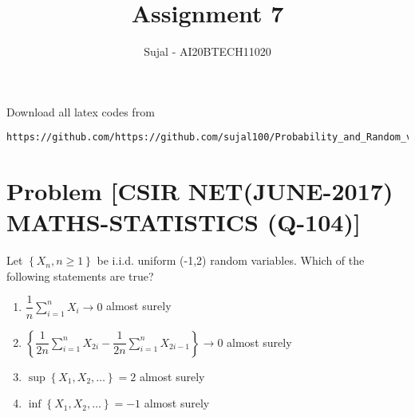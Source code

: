 \documentclass[journal,12pt,twocolumn]{IEEEtran}
\begin{document}
\let\StandardTheFigure\thefigure
\let\vec\mathbf
\renewcommand{\thefigure}{\theproblem}
\def\putbox#1#2#3{\makebox[0in][l]{\makebox[#1][l]{}\raisebox{\baselineskip}[0in][0in]{\raisebox{#2}[0in][0in]{#3}}}}
     \def\rightbox#1{\makebox[0in][r]{#1}}
     \def\centbox#1{\makebox[0in]{#1}}
     \def\topbox#1{\raisebox{-\baselineskip}[0in][0in]{#1}}
     \def\midbox#1{\raisebox{-0.5\baselineskip}[0in][0in]{#1}}
\vspace{3cm}
\title{Assignment 7}
\author{Sujal - AI20BTECH11020}
\maketitle
\newpage
\bigskip
\renewcommand{\thefigure}{\theenumi}
\renewcommand{\thetable}{\theenumi}
Download all latex codes from 

\begin{lstlisting}
https://github.com/https://github.com/sujal100/Probability_and_Random_variable/blob/main/exercise_6/exercise_6_main_tex.tex
\end{lstlisting}

\section{Problem [CSIR NET(JUNE-2017) MATHS-STATISTICS (Q-104)]}
Let $\left\{X_{n}, n \geq 1\right\}$ be i.i.d. uniform (-1,2) random variables. Which of the following statements are true?
\begin{enumerate}[label=\alph*)]
\item $\dfrac{1}{n} \sum_{i=1}^{n} X_{i} \rightarrow 0$ almost surely
\item $\left\{\dfrac{1}{2 n} \sum_{i=1}^{n} X_{2 i}-\dfrac{1}{2 n} \sum_{i=1}^{n} X_{2 i-1}\right\}\rightarrow 0$
almost surely
\item $\sup \left\{X_{1}, X_{2}, \ldots\right\}=2$ almost surely
\item $\inf \left\{X_{1}, X_{2}, \ldots\right\}=-1$ almost surely
\end{enumerate}
\end{document}
